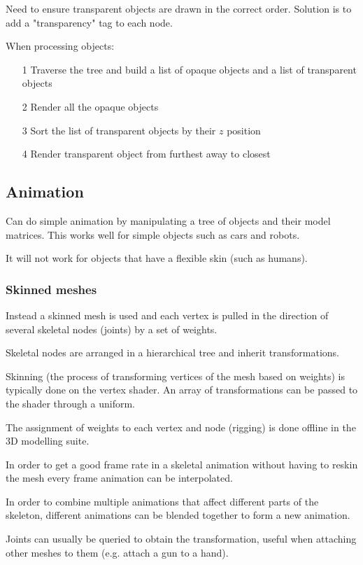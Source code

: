 \documentclass[a4paper]{article}
\begin{document}
Need to ensure transparent objects are drawn in the correct order. Solution is
to add a "transparency" tag to each node.

When processing objects:
\begin{enumerate}
  \item[1] Traverse the tree and build a list of opaque objects and a list of
           transparent objects
  \item[2] Render all the opaque objects
  \item[3] Sort the list of transparent objects by their $z$ position
  \item[4] Render transparent object from furthest away to closest
\end{enumerate}

\subsection{Animation}

Can do simple animation by manipulating a tree of objects and their model
matrices. This works well for simple objects such as cars and robots.

It will not work for objects that have a flexible skin (such as humans).

\subsubsection{Skinned meshes}

Instead a skinned mesh is used and each vertex is pulled in the direction of
several skeletal nodes (joints) by a set of weights.

Skeletal nodes are arranged in a hierarchical tree and inherit transformations.

Skinning (the process of transforming vertices of the mesh based on weights) is
typically done on the vertex shader. An array of transformations can be passed
to the shader through a uniform.

The assignment of weights to each vertex and node (rigging) is done offline in
the 3D modelling suite.

In order to get a good frame rate in a skeletal animation without having to
reskin the mesh every frame animation can be interpolated.

In order to combine multiple animations that affect different parts of the
skeleton, different animations can be blended together to form a new animation.

Joints can usually be queried to obtain the transformation, useful when
attaching other meshes to them (e.g. attach a gun to a hand).
\end{document}
